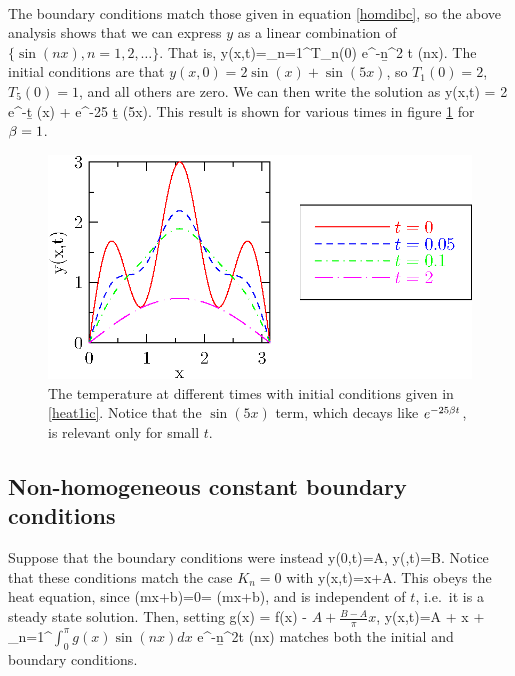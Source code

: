 \documentclass[12pt]{article}
\begin{document}
\\
{
  The boundary conditions match those given in equation \eqref{homdibc}, so
  the above analysis shows that we can express $y$ as a linear combination
  of $\{\sin(nx),n=1,2,\dots\}$. That is,
  \be
  y(x,t)=\sum_{n=1}^\infty T_n(0) e^{-\b n^2 t} \sin(nx).
  \ee
  The initial conditions are that $y(x,0)=2\sin(x)+\sin(5x)$, so $T_1(0)=2$,
  $T_5(0)=1$, and all others are zero. We can then write the solution as
  \be
  y(x,t) = 2 e^{-\b t} \sin(x) + e^{-25 \b t} \sin(5x).
  \ee
 This result is shown for various times in figure \ref{heat1} for $\beta=1$.
  \begin{figure}[htbp]
    \begin{center}
      \includegraphics{201/heat1}
      \caption{The temperature at different times with initial conditions
        given in \eqref{heat1ic}. Notice that the $\sin(5x)$ term, which 
        decays like $e^{-25 \beta t}$, is relevant only for small $t$. }
      \label{heat1}
    \end{center}
  \end{figure}
}


\subsection{Non-homogeneous constant boundary conditions}

Suppose that the boundary conditions were instead
\be
y(0,t)=A, \qquad y(\pi,t)=B.
\ee
Notice that these conditions match the case $K_n=0$ with
\be
y(x,t)=x+A.
\ee
This obeys the heat equation, since 
\be
{}(mx+b)=0= (mx+b),
\ee
and is independent of $t$, i.e.\ it is a steady state solution. Then, setting
\be
g(x) = f(x) - \(A+ \frac{B-A}{\pi}x\),
\ee
\be
\label{diribc}
y(x,t)=A + x +
\sum_{n=1}^\infty\(\int_{0}^\pi g(x)\sin(nx)dx\) e^{-\b n^2t} \sin(nx)
\ee
matches both the initial and boundary conditions.
\end{document}
